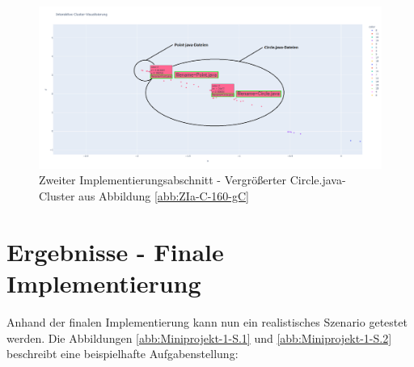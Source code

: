 \begin{figure} %
	\centering
	\includegraphics[width=1.0\textwidth]{images/Clusterung - 160 - gemischte Cluster - zoom.pdf}
	\caption{Zweiter Implementierungsabschnitt - Vergrößerter Circle.java-Cluster aus Abbildung \ref{abb:ZIa-C-160-gC}}
	\label{abb:ZIa-C-160-gC-z}
\end{figure}

\section{Ergebnisse - Finale Implementierung}
Anhand der finalen Implementierung kann nun ein realistisches Szenario getestet werden. Die Abbildungen \ref{abb:Miniprojekt-1-S.1} und \ref{abb:Miniprojekt-1-S.2} beschreibt eine beispielhafte Aufgabenstellung:

